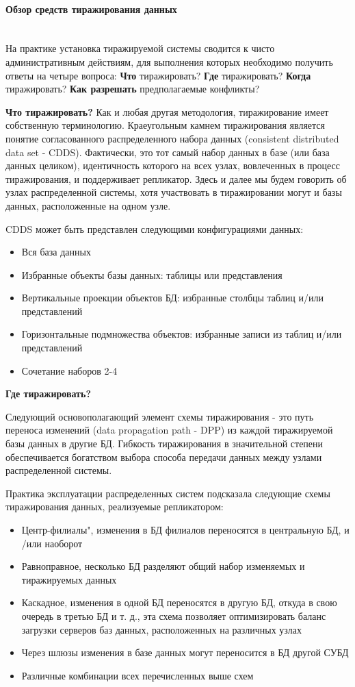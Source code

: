 \paragraph{Обзор средств тиражирования данных}~\\
На практике установка тиражируемой системы сводится к чисто административным действиям, для выполнения которых
необходимо получить ответы на четыре вопроса: \textbf{Что} тиражировать? \textbf{Где} тиражировать? \textbf{Когда}
тиражировать? \textbf{Как разрешать} предполагаемые конфликты?

\bigbreak
\textbf{Что тиражировать?}
Как и любая другая методология, тиражирование имеет собственную терминологию. Краеугольным камнем
тиражирования является понятие согласованного распределенного набора данных (consistent distributed data set - CDDS).
Фактически, это тот самый набор данных в базе (или база данных целиком), идентичность которого на всех узлах, вовлеченных
в процесс тиражирования, и поддерживает репликатор. Здесь и далее мы будем говорить об узлах распределенной
системы, хотя участвовать в тиражировании могут и базы данных, расположенные на одном узле.

CDDS может быть представлен следующими конфигурациями данных:
\begin{itemize}
    \item Вся база данных
    \item Избранные объекты базы данных: таблицы или представления
    \item Вертикальные проекции объектов БД: избранные столбцы таблиц и/или представлений
    \item Горизонтальные подмножества объектов: избранные записи из таблиц и/или представлений
    \item Сочетание наборов 2-4
\end{itemize}

\bigbreak
\textbf{Где тиражировать?}

Следующий основополагающий элемент схемы тиражирования - это путь переноса изменений
(data propagation path - DPP) из каждой тиражируемой базы данных в другие БД. Гибкость тиражирования
в значительной степени обеспечивается богатством выбора способа передачи данных между узлами распределенной системы.

Практика эксплуатации распределенных систем подсказала следующие схемы тиражирования данных, реализуемые репликатором:

\begin{itemize}
    \item Центр-филиалы", изменения в БД филиалов переносятся в центральную БД, и /или наоборот
    \item Равноправное, несколько БД разделяют общий набор изменяемых и тиражируемых данных
    \item Каскадное, изменения в одной БД переносятся в другую БД, откуда в свою очередь в третью БД и т. д.,
    эта схема позволяет оптимизировать баланс загрузки серверов баз данных, расположенных на различных узлах
    \item Через шлюзы изменения в базе данных могут переносится в БД другой СУБД
    \item Различные комбинации всех перечисленных выше схем
\end{itemize}

